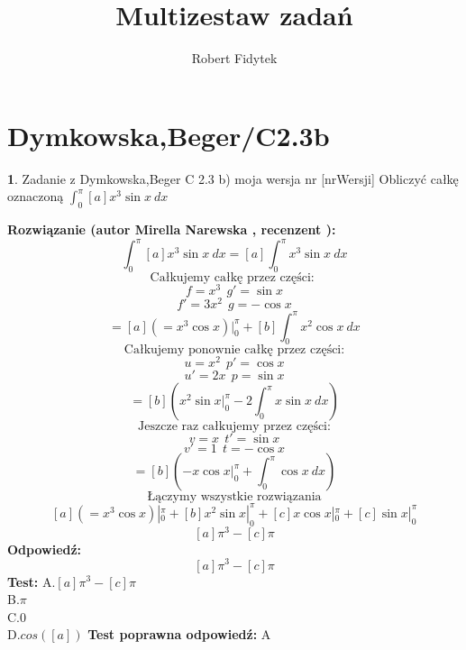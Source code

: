 \documentclass[12pt, a4paper]{article}
\title{Multizestaw zadań}
\author{Robert Fidytek}
\date{}
\theoremstyle{definition} %
\newtheorem{zad}{}
\newcommand{\kategoria}[1]{\section{#1}} %
\newcommand{\zadStart}[1]{\begin{zad}#1\newline} %
\newcommand{\zadStop}{\end{zad}}   %
\newcommand{\rozwStart}[2]{\noindent \textbf{Rozwiązanie (autor #1 , recenzent #2): }\newline} %
\newcommand{\odpStart}{\noindent \textbf{Odpowiedź:}\newline}    %
\newcommand{\odpStop}{\newline}                                             %
\newcommand{\testStart}{\noindent \textbf{Test:}\newline} %
\newcommand{\testStop}{\newline} %
\newcommand{\kluczStart}{\noindent \textbf{Test poprawna odpowiedź:}\newline} %
\newcommand{\kluczStop}{\newline} %
\begin{document}
\maketitle



\kategoria{Dymkowska,Beger/C2.3b}
\zadStart{Zadanie z Dymkowska,Beger C 2.3 b) moja wersja nr [nrWersji]}
Obliczyć całkę oznaczoną $\displaystyle \int_{0}^{\pi} [a]x^3\sin{x} \ dx $
\zadStop
\rozwStart{Mirella Narewska}{}
$$\int_{0}^{\pi} [a]x^3\sin{x} \ dx= [a]\int_{0}^{\pi} x^3\sin{x} \ dx$$
$$\text{Całkujemy całkę przez części: }$$
$$f=x^3 \ \ g'=\sin{x}$$
$$f'=3x^2 \ \ g=-\cos{x}$$
$$=[a]\left(=x^3\cos{x}\right)|_{0}^{\pi}+[b]\int_{0}^{\pi} x^2\cos{x} \ dx$$
$$\text{Całkujemy ponownie całkę przez części:}$$
$$u=x^2 \ \ p'=\cos{x}$$
$$u'=2x \ \ p=\sin{x}$$
$$=[b]\left(x^2\sin{x}|_{0}^{\pi}-2\int_{0}^{\pi} x\sin{x} \ dx \right)$$
$$\text{Jeszcze raz całkujemy przez części:}$$
$$v=x \ \ t'=\sin{x}$$
$$v'=1 \ \ t=-\cos{x}$$
$$=[b]\left(-x\cos{x}|_{0}^{\pi}+\int_{0}^{\pi} \cos{x} \ dx\right)$$
$$\text{Łączymy wszystkie rozwiązania}$$
$$[a]\left(=x^3\cos{x}\right)|_{0}^{\pi}+[b]x^2\sin{x}|_{0}^{\pi}+[c]x\cos{x}|_{0}^{\pi} +[c]\sin{x}|_{0}^{\pi}$$
$$[a]\pi^3-[c]\pi$$
\odpStart
$$[a]\pi^3-[c]\pi$$
\odpStop
\testStart
A.$[a]\pi^3-[c]\pi$
\\
B.$\pi$
\\
C.$0$
\\
D.$cos([a])$
\testStop
\kluczStart
A
\kluczStop
\end{document}
